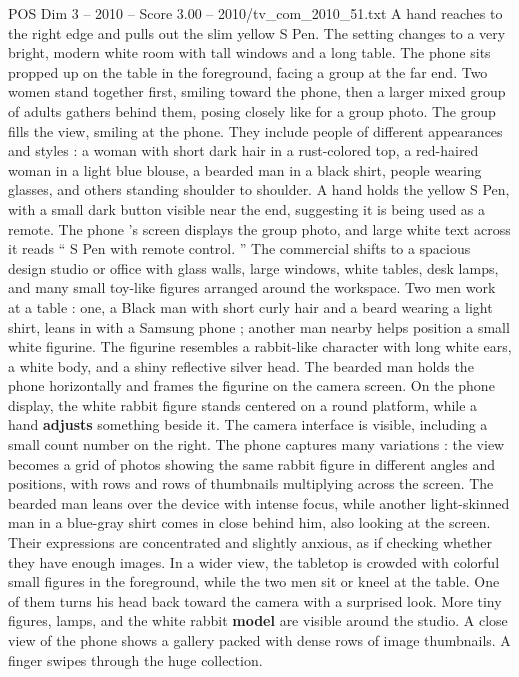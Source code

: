 \begin{textsample}{POS Dim 3 – 2010 – Score 3.00 – 2010/tv\_com\_2010\_51.txt}
A hand reaches to the right edge and pulls out the slim yellow S Pen.
The setting changes to a very bright, modern white room with tall windows and a long table.
The phone sits propped up on the table in the foreground, facing a group at the far end.
Two women stand together first, smiling toward the phone, then a larger mixed group of adults gathers behind them, posing closely like for a group photo.
The group fills the view, smiling at the phone.
They include people of different appearances and styles : a woman with short dark hair in a rust-colored top, a red-haired woman in a light blue blouse, a bearded man in a black shirt, people wearing glasses, and others standing shoulder to shoulder.
A hand holds the yellow S Pen, with a small dark button visible near the end, suggesting it is being used as a remote.
The phone ’s screen displays the group photo, and large white text across it reads “ S Pen with remote control. ” The commercial shifts to a spacious design studio or office with glass walls, large windows, white tables, desk lamps, and many small toy-like figures arranged around the workspace.
Two men work at a table : one, a Black man with short curly hair and a beard wearing a light shirt, leans in with a Samsung phone ; another man nearby helps position a small white figurine.
The figurine resembles a rabbit-like character with long white ears, a white body, and a shiny reflective silver head.
The bearded man holds the phone horizontally and frames the figurine on the camera screen.
On the phone display, the white rabbit figure stands centered on a round platform, while a hand \textbf{adjusts} something beside it.
The camera interface is visible, including a small count number on the right.
The phone captures many variations : the view becomes a grid of photos showing the same rabbit figure in different angles and positions, with rows and rows of thumbnails multiplying across the screen.
The bearded man leans over the device with intense focus, while another light-skinned man in a blue-gray shirt comes in close behind him, also looking at the screen.
Their expressions are concentrated and slightly anxious, as if checking whether they have enough images.
In a wider view, the tabletop is crowded with colorful small figures in the foreground, while the two men sit or kneel at the table.
One of them turns his head back toward the camera with a surprised look.
More tiny figures, lamps, and the white rabbit \textbf{model} are visible around the studio.
A close view of the phone shows a gallery packed with dense rows of image thumbnails.
A finger swipes through the huge collection.

\end{textsample}
